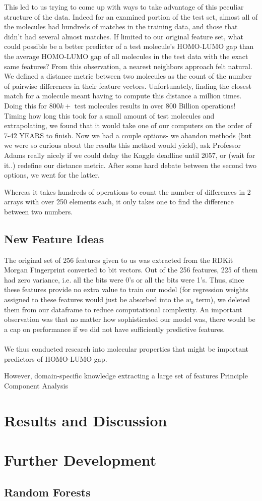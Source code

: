\documentclass[letterpaper]{article}
\begin{document}
This led to us trying to come up with ways to take advantage of this peculiar structure of the data. Indeed for an examined portion of the test set, almost all of the molecules had hundreds of matches in the training data, and those that didn't had several almost matches. If limited to our original feature set, what could possible be a better predicter of a test molecule's HOMO-LUMO gap than the average HOMO-LUMO gap of all molecules in the test data with the exact same features? From this observation, a nearest neighbors approach felt natural. We defined a distance metric between two molecules as the count of the number of pairwise differences in their feature vectors. Unfortunately, finding the closest match for a molecule meant having to compute this distance a million times. Doing this for $800k+$ test molecules results in over 800 Billion operations! Timing how long this took for a small amount of test molecules and extrapolating, we found that it would take one of our computers on the order of 7-42 YEARS to finish. Now we had a couple options- we abandon methods (but we were so curious about the results this method would yield), ask Professor Adams really nicely if we could delay the Kaggle deadline until 2057, or (wait for it..) redefine our distance metric. After some hard debate between the second two options, we went for the latter.

Whereas it takes hundreds of operations to count the number of differences in 2 arrays with over 250 elements each, it only takes one to find the difference between two numbers.

\subsection{New Feature Ideas}
The original set of 256 features given to us was extracted from the RDKit Morgan Fingerprint converted to bit vectors. Out of the 256 features, 225 of them had zero variance, i.e. all the bits were 0's or all the bits were 1's. Thus, since these features provide no extra value to train our model (for regression weights assigned to these features would just be absorbed into the $w_0$ term), we deleted them from our dataframe to reduce computational complexity. An important observation was that no matter how sophisticated our model was, there would be a cap on performance if we did not have sufficiently predictive features.\\
\\
We thus conducted research into molecular properties that might be important predictors of HOMO-LUMO gap. 

However, domain-specific knowledge 
extracting a large set of features 
Principle Component Analysis

\section{Results and Discussion}

\section{Further Development}
\subsection{Random Forests}
\end{document}
